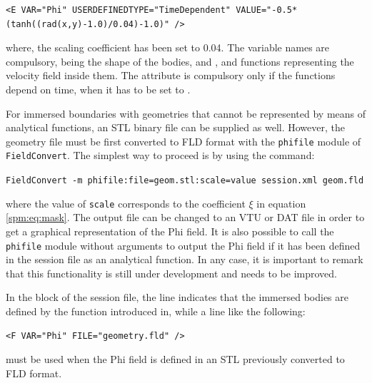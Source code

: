 \begin{lstlisting}[style=XMLStyle]
    <E VAR="Phi" USERDEFINEDTYPE="TimeDependent" VALUE="-0.5*(tanh((rad(x,y)-1.0)/0.04)-1.0)" />
\end{lstlisting}

where, the scaling coefficient has been set to 0.04. The variable names are
compulsory, being  the shape of the bodies, and ,
 and  functions representing the velocity field inside them.
The attribute  is compulsory only if the functions depend
on time, when it has to be set to .

For immersed boundaries with geometries that cannot be represented by means of
analytical functions, an STL binary file can be supplied as well. However, the
geometry file must be first converted to FLD format with the \texttt{phifile}
module of \texttt{FieldConvert}. The simplest way to proceed is by using the
command:

\texttt{FieldConvert -m phifile:file=geom.stl:scale=value session.xml geom.fld}

where the value of \texttt{scale} corresponds to the coefficient $\xi$ in
equation \eqref{spm:eq:mask}. The output file can be changed to an VTU or DAT
file in order to get a graphical representation of the Phi field. It is also
possible to call the \texttt{phifile} module without arguments to output the Phi
field if it has been defined in the session file as an analytical function. In
any case, it is important to remark that this functionality is still under
development and needs to be improved.

In the  block of the session file, the line
 indicates that the immersed bodies are defined by
the function introduced in, while a line like the following:

\begin{lstlisting}[style=XMLStyle]
    <F VAR="Phi" FILE="geometry.fld" />
\end{lstlisting}

must be used when the Phi field is defined in an STL previously converted to FLD
format.

